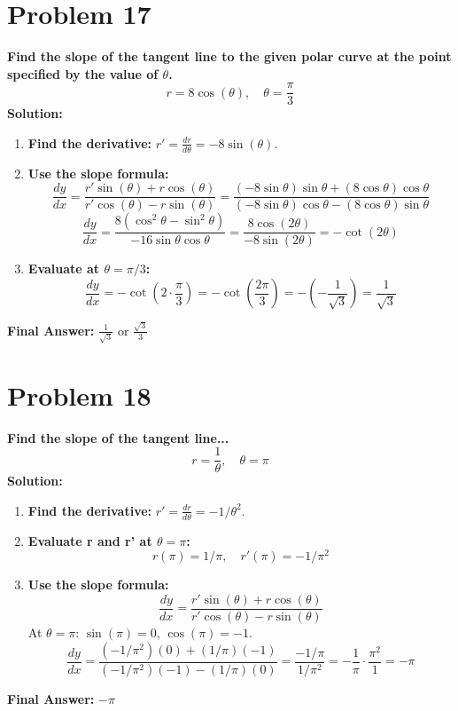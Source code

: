 \documentclass{article}
\begin{document}
\section*{Problem 17}
\textbf{Find the slope of the tangent line to the given polar curve at the point specified by the value of $\theta$.}
\[ r = 8\cos(\theta), \quad \theta = \frac{\pi}{3} \]
\textbf{Solution:}
\begin{enumerate}
    \item \textbf{Find the derivative:} $r' = \frac{dr}{d\theta} = -8\sin(\theta)$.
    \item \textbf{Use the slope formula:}
    \[ \frac{dy}{dx} = \frac{r' \sin(\theta) + r \cos(\theta)}{r' \cos(\theta) - r \sin(\theta)} = \frac{(-8\sin\theta)\sin\theta + (8\cos\theta)\cos\theta}{(-8\sin\theta)\cos\theta - (8\cos\theta)\sin\theta} \]
    \[ \frac{dy}{dx} = \frac{8(\cos^2\theta - \sin^2\theta)}{-16\sin\theta\cos\theta} = \frac{8\cos(2\theta)}{-8\sin(2\theta)} = -\cot(2\theta) \]
    \item \textbf{Evaluate at $\theta = \pi/3$:}
    \[ \frac{dy}{dx} = -\cot(2 \cdot \frac{\pi}{3}) = -\cot(\frac{2\pi}{3}) = -(-\frac{1}{\sqrt{3}}) = \frac{1}{\sqrt{3}} \]
\end{enumerate}
\textbf{Final Answer:} $\frac{1}{\sqrt{3}}$ or $\frac{\sqrt{3}}{3}$

\section*{Problem 18}
\textbf{Find the slope of the tangent line...}
\[ r = \frac{1}{\theta}, \quad \theta = \pi \]
\textbf{Solution:}
\begin{enumerate}
    \item \textbf{Find the derivative:} $r' = \frac{dr}{d\theta} = -1/\theta^2$.
    \item \textbf{Evaluate r and r' at $\theta = \pi$:}
    \[ r(\pi) = 1/\pi, \quad r'(\pi) = -1/\pi^2 \]
    \item \textbf{Use the slope formula:}
    \[ \frac{dy}{dx} = \frac{r' \sin(\theta) + r \cos(\theta)}{r' \cos(\theta) - r \sin(\theta)} \]
    At $\theta = \pi$: $\sin(\pi)=0$, $\cos(\pi)=-1$.
    \[ \frac{dy}{dx} = \frac{(-1/\pi^2)(0) + (1/\pi)(-1)}{(-1/\pi^2)(-1) - (1/\pi)(0)} = \frac{-1/\pi}{1/\pi^2} = -\frac{1}{\pi} \cdot \frac{\pi^2}{1} = -\pi \]
\end{enumerate}
\textbf{Final Answer:} $-\pi$
\end{document}
